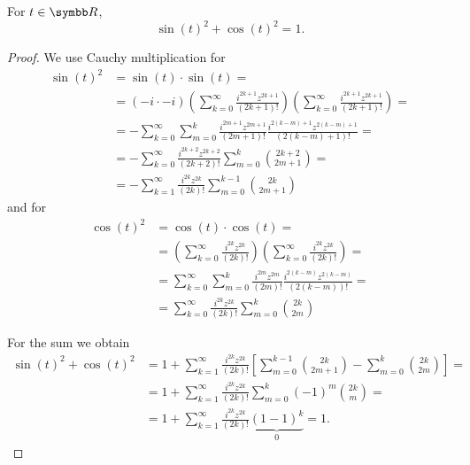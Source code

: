 \begin{proposition}\label{thm:pythagorean_identity}
  For \( t \in \R \),
  \begin{equation*}
    \sin(t)^2 + \cos(t)^2 = 1.
  \end{equation*}
\end{proposition}
\begin{proof}
  We use Cauchy multiplication for
  \begin{align*}
    \sin(t)^2
    &=
    \sin(t) \cdot \sin(t)
    = \\ &=
    (-i \cdot -i) \left( \sum_{k=0}^\infty \frac {i^{2k+1} z^{2k+1}} {(2k+1)!} \right) \left( \sum_{k=0}^\infty \frac {i^{2k+1} z^{2k+1}} {(2k+1)!} \right)
    = \\ &=
    -\sum_{k=0}^\infty \sum_{m=0}^k \frac {i^{2m+1} z^{2m+1}} {(2m+1)!} \frac {i^{2(k-m)+1} z^{2(k-m)+1}} {(2(k-m)+1)!}
    = \\ &=
    -\sum_{k=0}^\infty \frac {i^{2k+2} z^{2k+2}} {(2k+2)!} \sum_{m=0}^k \binom {2k+2} {2m+1}
    = \\ &=
    -\sum_{k=1}^\infty \frac {i^{2k} z^{2k}} {(2k)!} \sum_{m=0}^{k-1} \binom {2k} {2m+1}
  \end{align*}
  and for
  \begin{align*}
    \cos(t)^2
    &=
    \cos(t) \cdot \cos(t)
    = \\ &=
    \left( \sum_{k=0}^\infty \frac {i^{2k} z^{2k}} {(2k)!} \right) \left( \sum_{k=0}^\infty \frac {i^{2k} z^{2k}} {(2k)!} \right)
    = \\ &=
    \sum_{k=0}^\infty \sum_{m=0}^k \frac {i^{2m} z^{2m}} {(2m)!} \frac {i^{2(k-m)} z^{2(k-m)}} {(2(k-m))!}
    = \\ &=
    \sum_{k=0}^\infty \frac {i^{2k} z^{2k}} {(2k)!} \sum_{m=0}^k \binom {2k} {2m}
  \end{align*}

  For the sum we obtain
  \begin{align*}
    \sin(t)^2 + \cos(t)^2
    &=
    1 + \sum_{k=1}^\infty \frac {i^{2k} z^{2k}} {(2k)!} \left[ \sum_{m=0}^{k-1} \binom {2k} {2m+1} - \sum_{m=0}^k \binom {2k} {2m} \right]
    = \\ &=
    1 + \sum_{k=1}^\infty \frac {i^{2k} z^{2k}} {(2k)!} \sum_{m=0}^k (-1)^m \binom {2k} m
    = \\ &=
    1 + \sum_{k=1}^\infty \frac {i^{2k} z^{2k}} {(2k)!} \underbrace{(1 - 1)^k}_0
    =
    1.
  \end{align*}
\end{proof}

